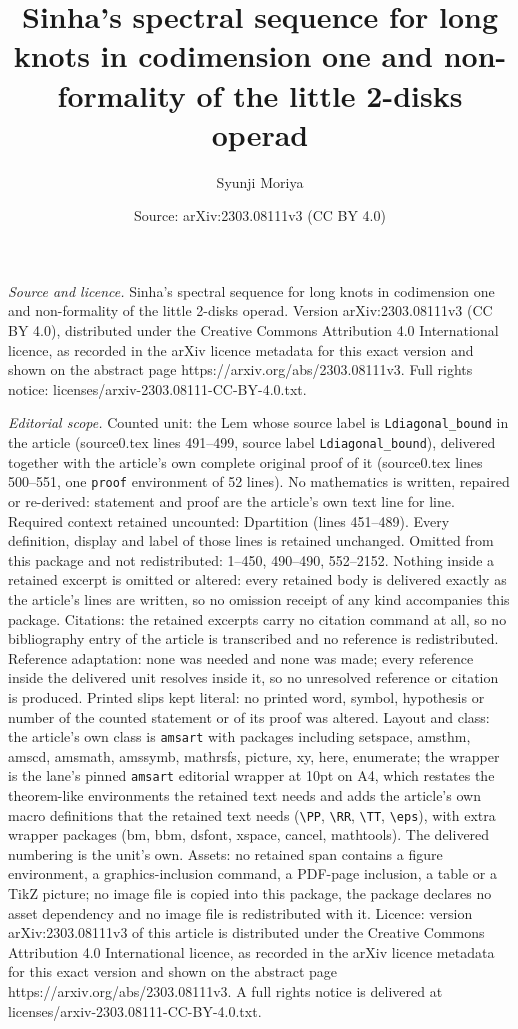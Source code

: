 \documentclass[10pt,a4paper]{amsart}
\title[Sinha's spectral sequence for long knots in codimension one ]{Sinha's spectral sequence for long knots in codimension one and non-formality of the little 2-disks operad}
\author{Syunji Moriya}
\date{Source: arXiv:2303.08111v3 (CC BY 4.0)}
\begin{document}
\maketitle

\noindent\emph{Source and licence.} Sinha's spectral sequence for long knots in codimension one and non-formality of the little 2-disks operad. Version arXiv:2303.08111v3 (CC BY 4.0), distributed under the Creative Commons Attribution 4.0 International licence, as recorded in the arXiv licence metadata for this exact version and shown on the abstract page https://arxiv.org/abs/2303.08111v3. Full rights notice: licenses/arxiv-2303.08111-CC-BY-4.0.txt.\par\smallskip

\noindent\textit{Editorial scope.} Counted unit: the Lem whose source label is \texttt{Ldiagonal\_bound} in the article (source0.tex lines 491--499, source label \texttt{Ldiagonal\_bound}), delivered together with the article's own complete original proof of it (source0.tex lines 500--551, one \texttt{proof} environment of 52 lines). No mathematics is written, repaired or re-derived: statement and proof are the article's own text line for line. Required context retained uncounted: Dpartition (lines 451--489). Every definition, display and label of those lines is retained unchanged. Omitted from this package and not redistributed: 1--450, 490--490, 552--2152. Nothing inside a retained excerpt is omitted or altered: every retained body is delivered exactly as the article's lines are written, so no omission receipt of any kind accompanies this package. Citations: the retained excerpts carry no citation command at all, so no bibliography entry of the article is transcribed and no reference is redistributed. Reference adaptation: none was needed and none was made; every reference inside the delivered unit resolves inside it, so no unresolved reference or citation is produced. Printed slips kept literal: no printed word, symbol, hypothesis or number of the counted statement or of its proof was altered. Layout and class: the article's own class is \texttt{amsart} with packages including setspace, amsthm, amscd, amsmath, amssymb, mathrsfs, picture, xy, here, enumerate; the wrapper is the lane's pinned \texttt{amsart} editorial wrapper at 10pt on A4, which restates the theorem-like environments the retained text needs and adds the article's own macro definitions that the retained text needs (\texttt{\textbackslash PP}, \texttt{\textbackslash RR}, \texttt{\textbackslash TT}, \texttt{\textbackslash eps}), with extra wrapper packages (bm, bbm, dsfont, xspace, cancel, mathtools). The delivered numbering is the unit's own. Assets: no retained span contains a figure environment, a graphics-inclusion command, a PDF-page inclusion, a table or a TikZ picture; no image file is copied into this package, the package declares no asset dependency and no image file is redistributed with it. Licence: version arXiv:2303.08111v3 of this article is distributed under the Creative Commons Attribution 4.0 International licence, as recorded in the arXiv licence metadata for this exact version and shown on the abstract page https://arxiv.org/abs/2303.08111v3. A full rights notice is delivered at licenses/arxiv-2303.08111-CC-BY-4.0.txt. 
\end{document}

